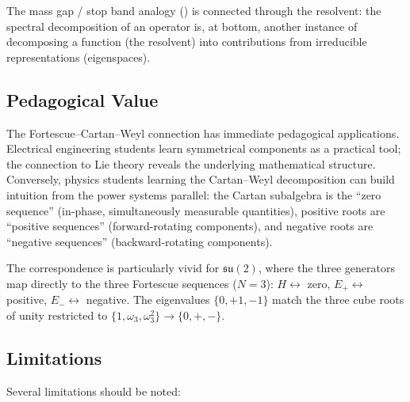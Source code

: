 \documentclass[11pt]{article}
\newcommand{\su}{\mathfrak{su}}
\begin{document}
The mass gap / stop band analogy () is
connected through the resolvent: the spectral decomposition of an
operator is, at bottom, another instance of decomposing a function
(the resolvent) into contributions from irreducible representations
(eigenspaces).

\subsection{Pedagogical Value}

The Fortescue--Cartan--Weyl connection has immediate pedagogical
applications. Electrical engineering students learn symmetrical
components as a practical tool; the connection to Lie theory reveals
the underlying mathematical structure. Conversely, physics students
learning the Cartan--Weyl decomposition can build intuition from the
power systems parallel: the Cartan subalgebra is the ``zero sequence''
(in-phase, simultaneously measurable quantities), positive roots are
``positive sequences'' (forward-rotating components), and negative
roots are ``negative sequences'' (backward-rotating components).

The correspondence is particularly vivid for $\su(2)$, where the three
generators map directly to the three Fortescue sequences
($N = 3$): $H \leftrightarrow$ zero, $E_+ \leftrightarrow$ positive,
$E_- \leftrightarrow$ negative. The eigenvalues $\{0, +1, -1\}$ match
the three cube roots of unity restricted to
$\{1, \omega_3, \omega_3^2\} \to \{0, +, -\}$.

\subsection{Limitations}

Several limitations should be noted:
\end{document}
